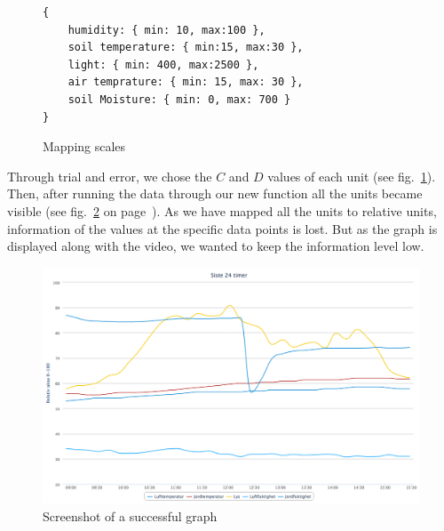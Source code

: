 
\begin{figure}
	\begin{lstlisting}[style=htmlcssjs]
{
	humidity: { min: 10, max:100 },
	soil temperature: { min:15, max:30 },
	light: { min: 400, max:2500 },
	air temprature: { min: 15, max: 30 },
	soil Moisture: { min: 0, max: 700 }
}
	\end{lstlisting}
	\caption{Mapping scales}
	\label{fig:mapscale}
\end{figure}

Through trial and error, we chose the \ensuremath{C} and \ensuremath{D} values of each unit (see fig.~\ref{fig:mapscale}). Then, after running the data through our new function all the units became visible (see fig.~\ref{fig:goodgraph} on page~\pageref{fig:goodgraph}). As we have mapped all the units to relative units, information of the values at the specific data points is lost. But as the graph is displayed along with the video, we wanted to keep the information level low.  

\begin{figure}
\centering
\includegraphics[width=1\textwidth]{img/interface/goodgraph.png}
\caption{Screenshot of a successful graph}
\label{fig:goodgraph}
\end{figure}



